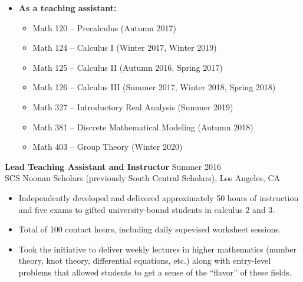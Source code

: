 \documentclass[margin]{res} %
\begin{document}
\begin{resume}
\begin{itemize}
\begin{itemize}
\end{itemize}
\item \textbf{As a teaching assistant:} 
\begin{itemize}
	\item Math 120 -- Precalculus (Autumn 2017)
	\item Math 124 -- Calculus I (Winter 2017, Winter 2019)
	\item Math 125 -- Calculus II (Autumn 2016, Spring 2017)
	\item Math 126 -- Calculus III (Summer 2017, Winter 2018, Spring 2018)
	\item Math 327 -- Introductory Real Analysis (Summer 2019)
	\item Math 381 -- Discrete Mathematical Modeling (Autumn 2018)
	\item Math 403 -- Group Theory (Winter 2020)
\end{itemize}
\end{itemize}
 
{\bf Lead Teaching Assistant and Instructor} \hfill Summer 2016 \\
SCS Noonan Scholars (previously South Central Scholars), Los Angeles, CA
\begin{itemize} \itemsep -1pt
\item Independently developed and delivered  approximately 50 hours of instruction and five exams to gifted university-bound students in calculus 2 and 3.
\item Total of 100 contact hours, including daily supevised worksheet sessions.
\item Took the initiative to deliver weekly lectures in higher mathematics (number theory, knot theory, differential equations, etc.) along with entry-level problems that allowed students to get a sense of the “flavor” of these fields.
\end{itemize} 


\end{resume}
\end{document}

